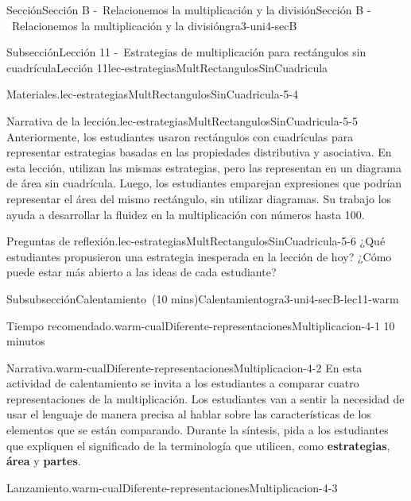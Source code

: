 \documentclass[oneside,10pt,]{article}
\newcommand{\terminology}[1]{\textbf{#1}}
\begin{document}
\begin{sectionptx}{Sección}{Sección B -~Relacionemos la multiplicación y la división}{}{Sección B -~Relacionemos la multiplicación y la división}{}{}{gra3-uni4-secB}
\begin{subsectionptx}{Subsección}{Lección 11 -~Estrategias de multiplicación para rectángulos sin cuadrícula}{}{Lección 11}{}{}{lec-estrategiasMultRectangulosSinCuadricula}
\begin{introduction}{}
\begin{paragraphs}{Materiales.}{lec-estrategiasMultRectangulosSinCuadricula-5-4}
\begin{itemize}[label=\textbullet]
\begin{itemize}[label=$\circ$]
\end{itemize}
\end{itemize}
\end{paragraphs}%
\begin{paragraphs}{Narrativa de la lección.}{lec-estrategiasMultRectangulosSinCuadricula-5-5}%
Anteriormente, los estudiantes usaron rectángulos con cuadrículas para representar estrategias basadas en las propiedades distributiva y asociativa. En esta lección, utilizan las mismas estrategias, pero las representan en un diagrama de área sin cuadrícula. Luego, los estudiantes emparejan expresiones que podrían representar el área del mismo rectángulo, sin utilizar diagramas. Su trabajo los ayuda a desarrollar la fluidez en la multiplicación con números hasta 100.%
\end{paragraphs}%
\begin{paragraphs}{Preguntas de reflexión.}{lec-estrategiasMultRectangulosSinCuadricula-5-6}%
¿Qué estudiantes propusieron una estrategia inesperada en la lección de hoy? ¿Cómo puede estar más abierto a las ideas de cada estudiante?%
\end{paragraphs}%
\end{introduction}%
%
%
\typeout{************************************************}
\typeout{************************************************}
%
\begin{subsubsectionptx}{Subsubsección}{Calentamiento~(10 mins)}{}{Calentamiento}{}{}{gra3-uni4-secB-lec11-warm}
\par
\begin{paragraphs}{Tiempo recomendado.}{warm-cualDiferente-representacionesMultiplicacion-4-1}%
10 minutos%
\end{paragraphs}%
\begin{paragraphs}{Narrativa.}{warm-cualDiferente-representacionesMultiplicacion-4-2}%
En esta actividad de calentamiento se invita a los estudiantes a comparar cuatro representaciones de la multiplicación. Los estudiantes van a sentir la necesidad de usar el lenguaje de manera precisa al hablar sobre las características de los elementos que se están comparando. Durante la síntesis, pida a los estudiantes que expliquen el significado de la terminología que utilicen, como \terminology{estrategias}, \terminology{área} y \terminology{partes}.%
\end{paragraphs}%
\begin{paragraphs}{Lanzamiento.}{warm-cualDiferente-representacionesMultiplicacion-4-3}%
%
\begin{itemize}[label=\textbullet]

\end{itemize}
\end{paragraphs}
\end{subsubsectionptx}
\end{subsectionptx}
\end{sectionptx}
\end{document}
